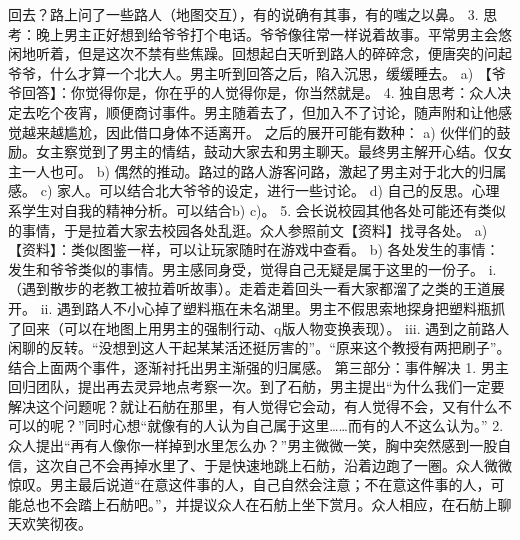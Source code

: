 回去？路上问了一些路人（地图交互），有的说确有其事，有的嗤之以鼻。
3.	思考：晚上男主正好想到给爷爷打个电话。爷爷像往常一样说着故事。平常男主会悠闲地听着，但是这次不禁有些焦躁。回想起白天听到路人的碎碎念，便唐突的问起爷爷，什么才算一个北大人。男主听到回答之后，陷入沉思，缓缓睡去。
a)	【爷爷回答】：你觉得你是，你在乎的人觉得你是，你当然就是。
4.	独自思考：众人决定去吃个夜宵，顺便商讨事件。男主随着去了，但加入不了讨论，随声附和让他感觉越来越尴尬，因此借口身体不适离开。 之后的展开可能有数种：
a)	伙伴们的鼓励。女主察觉到了男主的情结，鼓动大家去和男主聊天。最终男主解开心结。仅女主一人也可。
b)	偶然的推动。路过的路人游客问路，激起了男主对于北大的归属感。
c)	家人。可以结合北大爷爷的设定，进行一些讨论。
d)	自己的反思。心理系学生对自我的精神分析。可以结合b) c)。
5.	会长说校园其他各处可能还有类似的事情，于是拉着大家去校园各处乱逛。众人参照前文【资料】找寻各处。
a)	【资料】：类似图鉴一样，可以让玩家随时在游戏中查看。
b)	各处发生的事情：发生和爷爷类似的事情。男主感同身受，觉得自己无疑是属于这里的一份子。
i.	（遇到散步的老教工被拉着听故事）。走着走着回头一看大家都溜了之类的王道展开。
ii.	遇到路人不小心掉了塑料瓶在未名湖里。男主不假思索地探身把塑料瓶抓了回来（可以在地图上用男主的强制行动、q版人物变换表现）。
iii.	遇到之前路人闲聊的反转。“没想到这人干起某某活还挺厉害的”。“原来这个教授有两把刷子”。结合上面两个事件，逐渐衬托出男主渐强的归属感。
第三部分：事件解决
1.	男主回归团队，提出再去灵异地点考察一次。到了石舫，男主提出“为什么我们一定要解决这个问题呢？就让石舫在那里，有人觉得它会动，有人觉得不会，又有什么不可以的呢？”同时心想“就像有的人认为自己属于这里……而有的人不这么认为。”
2.	众人提出“再有人像你一样掉到水里怎么办？”男主微微一笑，胸中突然感到一股自信，这次自己不会再掉水里了、于是快速地跳上石舫，沿着边跑了一圈。众人微微惊叹。男主最后说道“在意这件事的人，自己自然会注意；不在意这件事的人，可能总也不会踏上石舫吧。”，并提议众人在石舫上坐下赏月。众人相应，在石舫上聊天欢笑彻夜。

